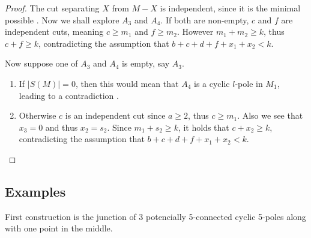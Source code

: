 \documentclass[12pt, twoside]{book}
\begin{document}
\begin{proof}
	The cut separating $X$ from $M-X$ is independent, since it is the minimal possible . Now we shall explore $A_3$ and $A_4$. If both are non-empty, $c$ and $f$ are independent cuts, meaning $c\geq m_1$ and $f\geq m_2$. However $m_1+m_2\geq k$, thus $c+f\geq k$, contradicting the assumption that $b+c+d+f+x_1+x_2<k$.
	
	Now suppose one of $A_3$ and $A_4$ is empty, say $A_3$.
	
	\begin{enumerate}
		\item If $|S(M)|=0$, then this would mean that $A_4$ is a cyclic $l$-pole in $M_1$, leading to a contradiction .
		\item Otherwise $c$ is an independent cut since $a\geq 2$, thus $c\geq m_1$. Also we see that $x_3=0$ and thus $x_2=s_2$. Since $m_1+s_2\geq k$, it holds that $c+x_2\geq k$, contradicting the assumption that $b+c+d+f+x_1+x_2<k$.
	\end{enumerate}
\end{proof}

\subsection{Examples}

First construction is the junction of 3 potencially 5-connected cyclic 5-poles along with one point in the middle.
\end{document}
